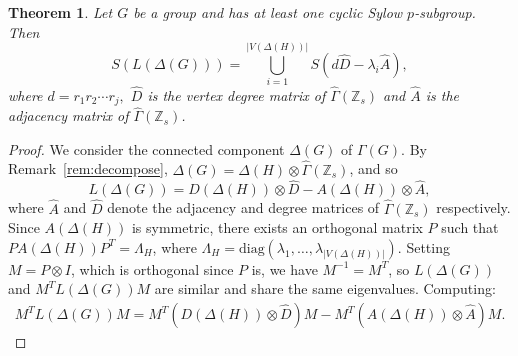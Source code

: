 \documentclass[10pt,a4paper]{amsart}
\newtheorem{theorem}{Theorem}
\def \Z {{\mathbb Z}}
\begin{document}
    \begin{theorem}\label{thm:lap}
Let $G$ be a group and has at least one cyclic Sylow $p$-subgroup. Then
            \[ S\left(L(\Delta(G))\right)
               = \bigcup_{i=1}^{|V(\Delta(H))|} 
                  S\left(d \widehat{D} - \lambda_i \widehat{A}\right), \]
            where $d=r_1r_2\cdots r_j,$ 
            $\widehat{D}$ is the vertex degree matrix of $\widehat{\Gamma}(\mathbb{Z}_s)$ and  
            $\widehat{A}$ is the adjacency matrix of $\widehat{\Gamma}(\mathbb{Z}_s)$.\index{Spectrum!for $\Z_n\times \Z_m$}
     \end{theorem}

    \begin{proof}
        We consider the connected component $\Delta(G)$ of $\Gamma(G)$. By 
     Remark~\ref{rem:decompose}, $\Delta(G) = \Delta(H)\otimes\widehat{
        \Gamma}(\mathbb{Z}_s)$, and so
        $$L(\Delta(G)) = D(\Delta(H))\otimes\widehat{D} - A(\Delta(H))
        \otimes\widehat{A},$$
        where $\widehat{A}$ and $\widehat{D}$ denote the adjacency and degree 
        matrices of $\widehat{\Gamma}(\mathbb{Z}_s)$ respectively. Since 
        $A(\Delta(H))$ is symmetric, there exists an orthogonal matrix $P$ 
        such that $PA(\Delta(H))P^T = \Lambda_H$, where $\Lambda_H = 
        \mathrm{diag}(\lambda_1,\ldots,\lambda_{|V(\Delta(H))|})$. Setting 
        $M = P\otimes I$, which is orthogonal since $P$ is, we have $M^{-1} 
        = M^T$, so $L(\Delta(G))$ and $M^TL(\Delta(G))M$ are similar and 
        share the same eigenvalues. Computing:
        \begin{align}\label{eq:abbound}
        M^TL(\Delta(G))M = M^T(D(\Delta(H))\otimes\widehat{D})M - 
        M^T(A(\Delta(H))\otimes\widehat{A})M.
        \end{align}
    

\end{proof}
\end{document}
